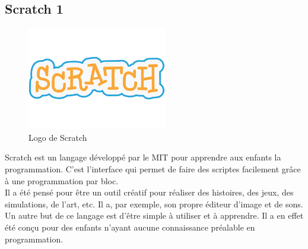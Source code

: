 \subsection{Scratch 1}
\begin{figure}[!h]
  \begin{center}
    \includegraphics[scale=0.4]{content/5-related_work/images/scratch}
    \caption{Logo de Scratch}
    \label{fig:scratch}
  \end{center}
\end{figure}
Scratch est un langage développé par le MIT pour apprendre aux enfants la programmation. C'est l'interface qui permet de faire des scriptes facilement grâce à une programmation par bloc.\\

Il a été pensé pour être un outil créatif pour réaliser des histoires, des jeux, des simulations, de l'art, etc. Il a, par exemple, son propre éditeur d'image et de sons. Un autre but de ce langage est d'être simple à utiliser et à apprendre. Il a en effet été conçu pour des enfants n'ayant aucune connaissance préalable en programmation.\\


